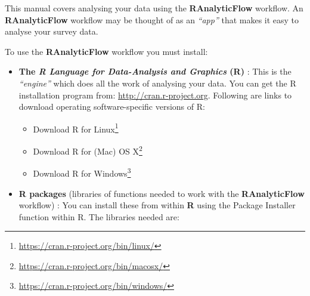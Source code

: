 \documentclass[12pt,a4paper]{book}
\let\rmarkdownfootnote\footnote%
\def\footnote{\protect\rmarkdownfootnote}
\renewcommand{\href}[2]{#2\footnote{\url{#1}}}
\begin{document}
This manual covers analysing your data using the \textbf{RAnalyticFlow} workflow. An \textbf{RAnalyticFlow} workflow may be thought of as an \emph{``app''} that makes it easy to analyse your survey data.

To use the \textbf{RAnalyticFlow} workflow you must install:

\begin{itemize}
\item
  \textbf{The \emph{R Language for Data-Analysis and Graphics} (R)} : This is the \emph{``engine''} which does all the
  work of analysing your data. You can get the R installation program from: \url{http://cran.r-project.org}. Following are links to download operating software-specific versions of R:

  \begin{itemize}
  \item
    \href{https://cran.r-project.org/bin/linux/}{Download R for Linux}
  \item
    \href{https://cran.r-project.org/bin/macosx/}{Download R for (Mac) OS X}
  \item
    \href{https://cran.r-project.org/bin/windows/}{Download R for Windows}
  \end{itemize}
\item
  \textbf{R packages} (libraries of functions needed to work with the \textbf{RAnalyticFlow} workflow) : You can install these from within \textbf{R} using the Package Installer function within R. The libraries needed are:
\end{itemize}
\end{document}
